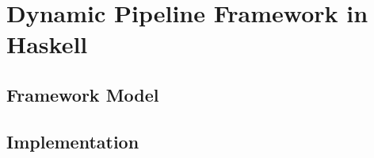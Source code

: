 \chapter{Dynamic Pipeline Framework in Haskell}
\section{Framework Model}
\section{Implementation}

